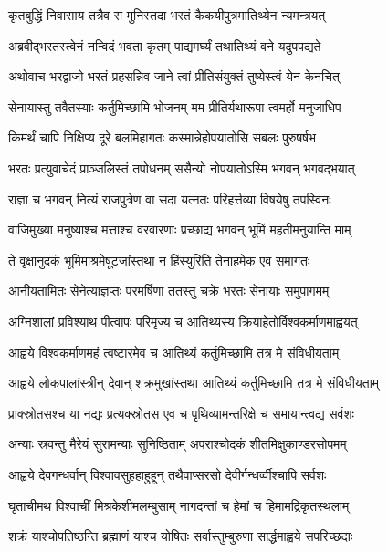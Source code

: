 
\twolineshloka
{कृतबुद्धिं निवासाय तत्रैव स मुनिस्तदा}
{भरतं कैकयीपुत्रमातिथ्येन न्यमन्त्रयत्} %

\twolineshloka
{अब्रवीद्भरतस्त्वेनं नन्विदं भवता कृतम्}
{पाद्यमर्घ्यं तथातिथ्यं वने यदुपपद्यते} %

\twolineshloka
{अथोवाच भरद्वाजो भरतं प्रहसन्निव}
{जाने त्वां प्रीतिसंयुक्तं तुष्येस्त्वं येन केनचित्} %

\twolineshloka
{सेनायास्तु तवैतस्याः कर्तुमिच्छामि भोजनम्}
{मम प्रीतिर्यथारूपा त्वमर्हो मनुजाधिप} %

\twolineshloka
{किमर्थं चापि निक्षिप्य दूरे बलमिहागतः}
{कस्मान्नेहोपयातोसि सबलः पुरुषर्षभ} %

\twolineshloka
{भरतः प्रत्युवाचेदं प्राञ्जलिस्तं तपोधनम्}
{ससैन्यो नोपयातोऽस्मि भगवन् भगवद्भयात्} %

\twolineshloka
{राज्ञा च भगवन् नित्यं राजपुत्रेण वा सदा}
{यत्नतः परिहर्त्तव्या विषयेषु तपस्विनः} %

\twolineshloka
{वाजिमुख्या मनुष्याश्च मत्ताश्च वरवारणाः}
{प्रच्छाद्य भगवन् भूमिं महतीमनुयान्ति माम्} %

\twolineshloka
{ते वृक्षानुदकं भूमिमाश्रमेषूटजांस्तथा}
{न हिंस्युरिति तेनाहमेक एव समागतः} %

\twolineshloka
{आनीयतामितः सेनेत्याज्ञप्तः परमर्षिणा}
{ततस्तु चक्रे भरतः सेनायाः समुपागमम्} %

\twolineshloka
{अग्निशालां प्रविश्याथ पीत्वापः परिमृज्य च}
{आतिथ्यस्य क्रियाहेतोर्विश्वकर्माणमाह्वयत्} %

\twolineshloka
{आह्वये विश्वकर्माणमहं त्वष्टारमेव च}
{आतिथ्यं कर्तुमिच्छामि तत्र मे संविधीयताम्} %

\twolineshloka
{आह्वये लोकपालांस्त्रीन् देवान् शक्रमुखांस्तथा}
{आतिथ्यं कर्तुमिच्छामि तत्र मे संविधीयताम्} %

\twolineshloka
{प्राक्स्रोतसश्च या नद्यः प्रत्यक्स्रोतस एव च}
{पृथिव्यामन्तरिक्षे च समायान्त्वद्य सर्वशः} %

\twolineshloka
{अन्याः स्रवन्तु मैरेयं सुरामन्याः सुनिष्ठिताम्}
{अपराश्चोदकं शीतमिक्षुकाण्डरसोपमम्} %

\twolineshloka
{आह्वये देवगन्धर्वान् विश्वावसुहहाहुहून्}
{तथैवाप्सरसो देवीर्गन्धर्व्वीश्चापि सर्वशः} %

\twolineshloka
{घृताचीमथ विश्वाचीं मिश्रकेशीमलम्बुसाम्}
{नागदन्तां च हेमां च हिमामद्रिकृतस्थलाम्} %

\twolineshloka
{शक्रं याश्चोपतिष्ठन्ति ब्रह्माणं याश्च योषितः}
{सर्वास्तुम्बुरुणा सार्द्धमाह्वये सपरिच्छदाः} %

